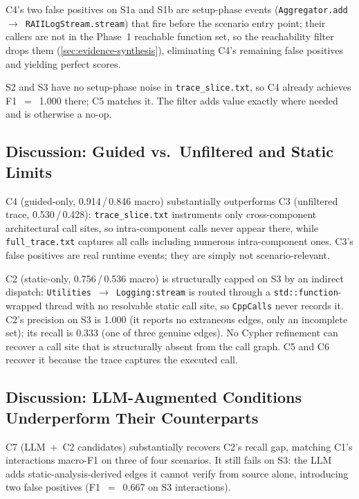 C4's two false positives on S1a and S1b are setup-phase events
(\texttt{Aggregator.add}~$\to$~\texttt{RAIILogStream.stream}) that fire
before the scenario entry point; their callers are not in the
Phase~1 reachable function set, so the reachability filter drops them
(\cref{sec:evidence-synthesis}), eliminating C4's remaining false
positives and yielding perfect scores.

S2 and S3 have no setup-phase noise in \texttt{trace\_slice.txt}, so C4
already achieves F1~$=$~1.000 there; C5 matches it. The filter adds
value exactly where needed and is otherwise a no-op.

\subsection{Discussion: Guided vs.\ Unfiltered and Static Limits}\label{sec:h1-c4c3}

C4 (guided-only, 0.914\,/\,0.846 macro) substantially outperforms C3
(unfiltered trace, 0.530\,/\,0.428): \texttt{trace\_slice.txt} instruments
only cross-component architectural call sites, so intra-component calls
never appear there, while \texttt{full\_trace.txt} captures all calls
including numerous intra-component ones. C3's false positives are real
runtime events; they are simply not scenario-relevant.

C2 (static-only, 0.756\,/\,0.536 macro) is structurally capped on S3 by
an indirect dispatch: \texttt{Utilities}~$\to$~\texttt{Logging:stream} is
routed through a \texttt{std::function}-wrapped thread with no resolvable
static call site, so \texttt{CppCalls} never records it. C2's precision
on S3 is 1.000 (it reports no extraneous edges, only an incomplete set);
its recall is 0.333 (one of three genuine edges). No Cypher refinement
can recover a call site that is structurally absent from the call graph.
C5 and C6 recover it because the trace captures the executed call.

\subsection{Discussion: LLM-Augmented Conditions Underperform Their Counterparts}\label{sec:h1-c5}

C7 (LLM~+~C2 candidates) substantially recovers C2's recall
gap, matching C1's interactions macro-F1 on three of four scenarios. It
still fails on S3: the \ac{LLM} adds static-analysis-derived edges it
cannot verify from source alone, introducing two false positives
(F1~$=$~0.667 on S3 interactions).

